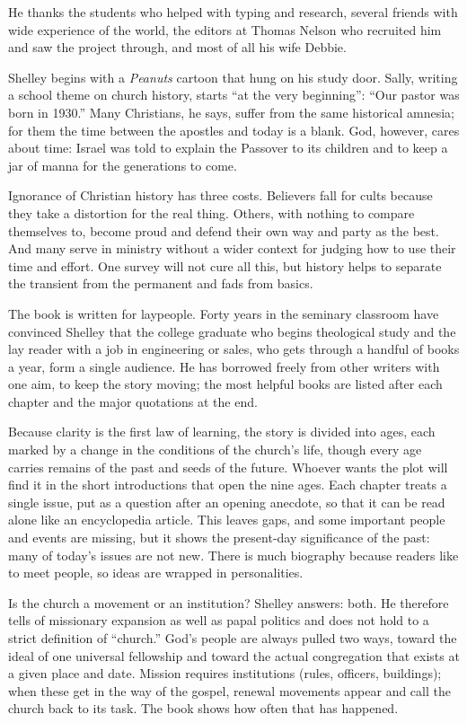 He thanks the students who helped with typing and research, several friends with wide experience of the world, the editors at Thomas Nelson who recruited him and saw the project through, and most of all his wife Debbie.

Shelley begins with a \emph{Peanuts} cartoon that hung on his study door. Sally, writing a school theme
on church history, starts ``at the very beginning'': ``Our pastor was born in 1930.'' Many Christians,
he says, suffer from the same historical amnesia; for them the time between the apostles and today is
a blank. God, however, cares about time: Israel was told to explain the Passover to its children and to
keep a jar of manna for the generations to come.

Ignorance of Christian history has three costs. Believers fall for cults because they take a distortion
for the real thing. Others, with nothing to compare themselves to, become proud and defend their own
way and party as the best. And many serve in ministry without a wider context for judging how to use
their time and effort. One survey will not cure all this, but history helps to separate the transient
from the permanent and fads from basics.

The book is written for laypeople. Forty years in the seminary classroom have convinced Shelley that the college graduate who begins theological study and the lay reader with a job in engineering or sales, who gets through a handful of books a year, form a single audience. He has borrowed freely from other writers with one aim, to keep the story
moving; the most helpful books are listed after each chapter and the major quotations at the end.

Because clarity is the first law of learning, the story is divided into ages, each marked by a change
in the conditions of the church's life, though every age carries remains of the past and seeds of the
future. Whoever wants the plot will find it in the short introductions that open the nine ages. Each
chapter treats a single issue, put as a question after an opening anecdote, so that it can be read
alone like an encyclopedia article. This leaves gaps, and some important people and events are missing,
but it shows the present-day significance of the past: many of today's issues are not new. There is
much biography because readers like to meet people, so ideas are wrapped in personalities.

Is the church a movement or an institution? Shelley answers: both. He therefore tells of missionary
expansion as well as papal politics and does not hold to a strict definition of ``church.'' God's people are always pulled two ways, toward the ideal of one universal fellowship and toward the actual congregation that exists at a given place and date. Mission requires institutions (rules, officers, buildings); when these get in the way of the gospel, renewal movements appear and call the church back to its task. The book shows how often that has happened.

